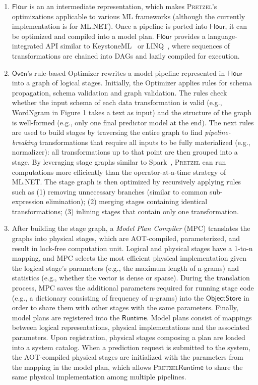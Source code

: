\documentclass[11pt]{article}
\newcommand{\pretzel}{\textsc{Pretzel}\xspace}
\newcommand{\mlnet}{ML.NET\xspace}
\newcommand{\at}[1]{\protect\ensuremath{\mathsf{#1}}\xspace}
\newcommand{\stitle}[1]{\noindent{\bf #1}}
\begin{document}
\begin{enumerate}
    \item \stitle{Model conversion:} \at{Flour} is an an intermediate representation, which makes \pretzel's optimizations applicable to various ML frameworks (although the currently implementation is for ML.NET). Once a pipeline is ported into \at{Flour}, it can be optimized and compiled into a model plan. \at{Flour} provides a language-integrated API similar to KeystoneML~\cite{keystone-ml} or LINQ~\cite{linq}, where sequences of transformations are chained into DAGs and lazily compiled for execution.

    \item \stitle{Optimization:} \at{Oven}'s rule-based Optimizer rewrites a model pipeline represented in \at{Flour} into a graph of logical stages. 
    Initially, the Optimizer applies rules for schema propagation, schema validation and graph validation. The rules check whether the input schema of each data transformation is valid (e.g., WordNgram in Figure 1 takes a text as input) and the structure of the graph is well-formed (e.g., only one final predictor model at the end). The next rules are used to build stages by traversing the entire graph to find \emph{pipeline-breaking} transformations that require all inputs to be fully materialized (e.g., normalizer): all transformations up to that point are then grouped into a stage.
    By leveraging stage graphs similar to Spark~\cite{rdd-nsdi2012}, \pretzel can run computations more efficiently than the operator-at-a-time strategy of \mlnet. The stage graph is then optimized by recursively applying rules such as (1) removing unnecessary branches (similar to common sub-expression elimination); (2) merging stages containing identical transformations; (3) inlining stages that contain only one transformation.
    
    \item \stitle{Compilation:} After building the stage graph, a \emph{Model Plan Compiler} (MPC) translates the graphs into physical stages, which are AOT-compiled, parameterized, and result in lock-free computation unit. Logical and physical stages have a 1-to-n mapping, and MPC selects the most efficient physical implementation given the logical stage's parameters (e.g., the maximum length of n-grams) and statistics (e.g., whether the vector is dense or sparse). During the translation process, MPC saves the additional parameters required for running stage code (e.g., a dictionary consisting of frequency of n-grams) into the \at{ObjectStore} in order to share them with other stages with the same parameters. 
    Finally, model plans are registered into the \at{Runtime}. Model plans consist of mappings between logical representations, physical implementations and the associated parameters. Upon registration, physical stages composing a plan are loaded into a system catalog. When a prediction request is submitted to the system, the AOT-compiled physical stages are initialized with the parameters from the mapping in the model plan, which allows \pretzel \at{Runtime} to share the same physical implementation among multiple pipelines.
\end{enumerate}
\end{document}
